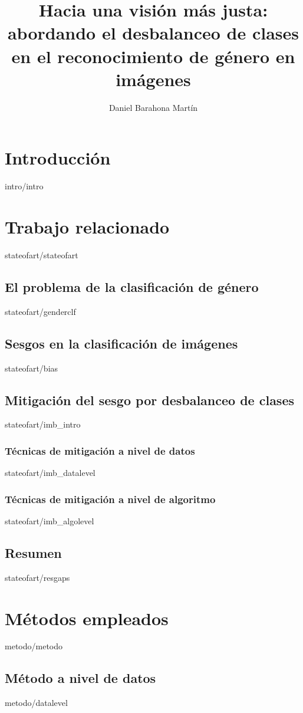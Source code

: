\documentclass[epsbased,copyright,final,printable,covers,extendedindex,firstnumbered,tfg,gnuplot]{tfgtfmthesisuam}
\title[]{Hacia una visión más justa: abordando el desbalanceo de clases en el reconocimiento de género en imágenes}
\author{Daniel Barahona Martín}
\begin{document}
\chapter{Introducción\label{CAP:INTRO}}{intro/intro}

\chapter{Trabajo relacionado\label{CAP:STATEOFART}}{stateofart/stateofart}
    \section{El problema de la clasificación de género\label{SEC:PROBLEMA}}{stateofart/genderclf}
    \section{Sesgos en la clasificación de imágenes\label{SEC:SESGO}}{stateofart/bias}
    \section{Mitigación del sesgo por desbalanceo de clases \label{SEC:IMBALANCE}}{stateofart/imb_intro}
        \subsection{Técnicas de mitigación a nivel de datos\label{SEC:SOTA_DATALEVEL}}{stateofart/imb_datalevel}
        \subsection{Técnicas de mitigación a nivel de algoritmo\label{SEC:SOTA_ALGOLEVEL}}{stateofart/imb_algolevel}
    \section{Resumen\label{SEC:RESGAPS}}{stateofart/resgaps}
    
\chapter{Métodos empleados\label{CAP:METODO}}{metodo/metodo}
    \section{Método a nivel de datos\label{SEC:DATALEVEL}}{metodo/datalevel}
\end{document}
